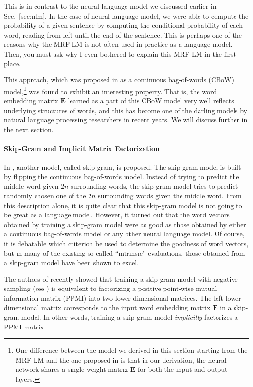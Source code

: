 \documentclass{report}
\newcommand{\matr}[1]{\mathbf{#1}}
\newcommand{\mE}[0]{\matr{E}}
\begin{document}
This is in contrast to the neural language model we discussed earlier in
Sec.~\ref{sec:nlm}. In the case of neural language model, we were able to
compute the probability of a given sentence by computing the conditional
probability of each word, reading from left until the end of the sentence. This
is perhaps one of the reasons why the MRF-LM is not often used in practice as a
language model. Then, you must ask why I even bothered to explain this MRF-LM in
the first place.

This approach, which was proposed in \cite{mikolov2013efficient} as a
continuous bag-of-words (CBoW) model,\footnote{
    One difference between the model we derived in this section starting from
    the MRF-LM and the one proposed in \cite{mikolov2013efficient} is that in
    our derivation, the neural network shares a single weight matrix $\mE$ for
    both the input and output layers.
} was found to exhibit an interesting property. That is, the word embedding
matrix $\mE$ learned as a part of this CBoW model very well reflects underlying
structures of words, and this has become one of the darling models by natural
language processing researchers in recent years. We will discuss further in the
next section.

\paragraph{Skip-Gram and Implicit Matrix Factorization}

In \cite{mikolov2013efficient}, another model, called skip-gram, is proposed.
The skip-gram model is built by flipping the continuous bag-of-words model.
Instead of trying to predict the middle word given $2n$ surrounding words, the
skip-gram model tries to predict randomly chosen one of the $2n$ surrounding
words given the middle word. From this description alone, it is quite clear that
this skip-gram model is not going to be great as a language model. However, it
turned out that the word vectors obtained by training a skip-gram model were as
good as those obtained by either a continuous bag-of-words model or any other
neural language model. Of course, it is debatable which criterion be used to
determine the goodness of word vectors, but in many of the existing so-called
``intrinsic'' evaluations, those obtained from a skip-gram model have been shown
to excel.

The authors of \cite{Omer2014} recently showed that training a skip-gram model
with negative sampling (see \cite{mikolov2013efficient}) is equivalent to
factorizing a positive point-wise mutual information matrix (PPMI) into two
lower-dimensional matrices. The left lower-dimensional matrix corresponds to the
input word embedding matrix $\mE$ in a skip-gram model. In other words, training
a skip-gram model {\em implicitly} factorizes a PPMI matrix. 
\end{document}
